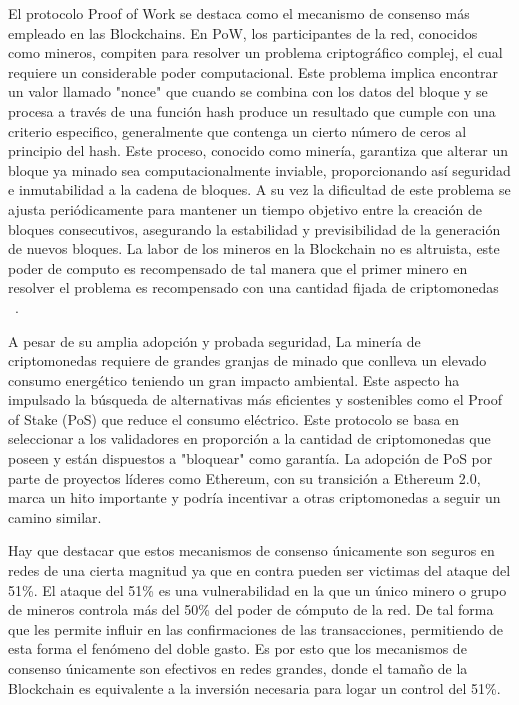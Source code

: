 El protocolo Proof of Work se destaca como el mecanismo de consenso más empleado en las Blockchains. En PoW, los participantes de la red, conocidos como mineros, compiten para resolver un problema criptográfico complej, el cual requiere un considerable poder computacional. Este problema implica encontrar un valor llamado "nonce" que cuando se combina con los datos del bloque y se procesa a través de una función hash produce un resultado que cumple con una criterio especifico, generalmente que contenga un cierto número de ceros al principio del hash.
Este proceso, conocido como minería, garantiza que alterar un bloque ya minado sea computacionalmente inviable, proporcionando así seguridad e inmutabilidad a la cadena de bloques. A su vez la dificultad de este problema se ajusta periódicamente para mantener un tiempo objetivo entre la creación de bloques consecutivos, asegurando la estabilidad y previsibilidad de la generación de nuevos bloques.
La labor de los mineros en la Blockchain no es altruista, este poder de computo es recompensado de tal manera que el primer minero en resolver el problema es recompensado con una cantidad fijada de criptomonedas ~\cite{PoW}.

A pesar de su amplia adopción y probada seguridad, La minería de criptomonedas requiere de grandes granjas de minado que conlleva un elevado consumo energético teniendo un gran impacto ambiental. 
Este aspecto ha impulsado la búsqueda de alternativas más eficientes y sostenibles como el Proof of Stake (PoS) que reduce el consumo eléctrico. Este protocolo se basa en seleccionar a los validadores en proporción a la cantidad de criptomonedas que poseen y están dispuestos a "bloquear" como garantía.
La adopción de PoS por parte de proyectos líderes como Ethereum, con su transición a Ethereum 2.0, marca un hito importante y podría incentivar a otras criptomonedas a seguir un camino similar.

Hay que destacar que estos mecanismos de consenso únicamente son seguros en redes de una cierta magnitud ya que en contra pueden ser victimas del ataque del 51\%.
El ataque del 51\% es una vulnerabilidad en la que un único minero o grupo de mineros controla más del 50\% del poder de cómputo de la red. De tal forma que les permite influir en las confirmaciones de las transacciones, permitiendo de esta forma el fenómeno del doble gasto.
Es por esto que los mecanismos de consenso únicamente son efectivos en redes grandes, donde el tamaño de la Blockchain es equivalente a la inversión necesaria para logar un control del 51\%.




